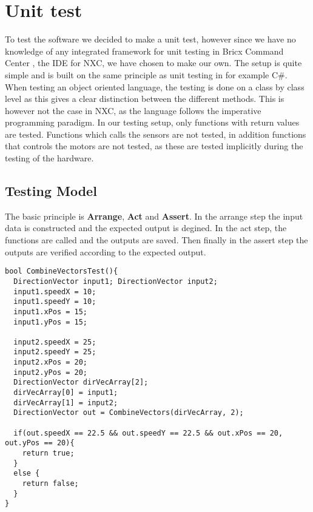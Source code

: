 \chapter{Unit test}

To test the \name software we decided to make a unit test, however since we
have no knowledge of any integrated framework for unit testing in Bricx Command
Center \cite{BricxCC}, the IDE for NXC, we have chosen to make our own. The
setup is quite simple and is built on the same principle as unit testing in for example C\#. When testing an
object oriented language, the testing is done on a class by class level as this
gives a clear distinction between the different methods. This is however not
the case in NXC, as the language follows the imperative programming paradigm.
In our testing setup, only functions with return values are tested. Functions
which calls the sensors are not tested, in addition functions that controls the
motors are not tested, as these are tested implicitly during the testing of the
hardware.

\section{Testing Model}
The basic principle is \textbf{Arrange}, \textbf{Act} and \textbf{Assert}. In
the arrange step the input data is constructed and the expected
output is degined. In the act step, the functions are called and the outputs are
saved. Then finally in the assert step the outputs are verified according to the
expected output. \nl

\begin{minipage}[H]{\linewidth}
\begin{lstlisting}[caption =Unit Test for
\texttt{CombineVectors},label=combineVectorsTest] 
bool CombineVectorsTest(){
  DirectionVector input1; DirectionVector input2;
  input1.speedX = 10;
  input1.speedY = 10;
  input1.xPos = 15;
  input1.yPos = 15;
  
  input2.speedX = 25;
  input2.speedY = 25;
  input2.xPos = 20;
  input2.yPos = 20;
  DirectionVector dirVecArray[2];
  dirVecArray[0] = input1;
  dirVecArray[1] = input2;
  DirectionVector out = CombineVectors(dirVecArray, 2);
  
  if(out.speedX == 22.5 && out.speedY == 22.5 && out.xPos == 20, out.yPos == 20){
    return true;
  }
  else {
    return false;
  }
}
\end{lstlisting}
\end{minipage}

